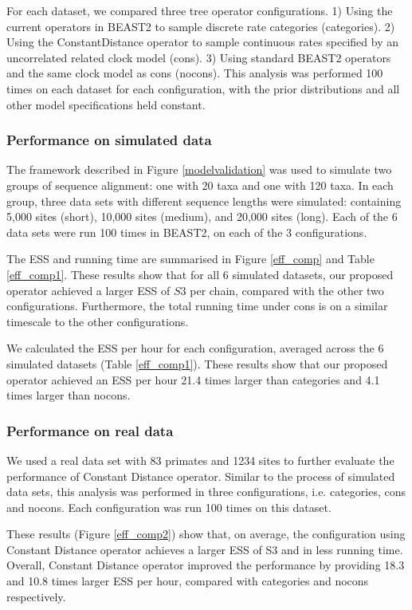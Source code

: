\documentclass{bmcart}
\begin{document}
For each dataset, we compared three tree operator configurations. 1) Using the current operators in BEAST2 to sample discrete rate categories (categories). 2) Using the ConstantDistance operator to sample continuous rates specified by an uncorrelated related clock model (cons). 3) Using standard BEAST2 operators and the same clock model as cons (nocons). This analysis was performed 100 times on each dataset for each configuration, with the prior distributions and all other model specifications held constant.

\subsubsection*{Performance on simulated data}
The framework described in Figure \ref{modelvalidation} was used to simulate two groups of sequence alignment: one with 20 taxa and one with 120 taxa. In each group, three data sets with different sequence lengths were simulated: containing 5,000 sites (short), 10,000 sites (medium), and 20,000 sites (long). Each of the 6 data sets were run 100 times in BEAST2, on each of the 3 configurations.

The ESS and running time are summarised in Figure \ref{eff_comp} and Table \ref{eff_comp1}. These results show that for all 6 simulated datasets, our proposed operator achieved a larger ESS of $S3$ per chain, compared with the other two configurations. Furthermore, the total running time under cons is on a similar timescale to the other configurations.

We calculated the ESS per hour for each configuration, averaged across the 6 simulated datasets (Table \ref{eff_comp1}). These results show that our proposed operator achieved an ESS per hour 21.4 times larger than categories and 4.1 times larger than nocons.

\subsubsection*{Performance on real data}
We used a real data set with 83 primates and 1234 sites \cite{finstermeier2013mitogenomic} to further evaluate the performance of Constant Distance operator. Similar to the process of simulated data sets, this analysis was performed in three configurations, i.e. categories, cons and nocons. Each configuration was run 100 times on this dataset.

These results (Figure \ref{eff_comp2}) show that, on average, the configuration using Constant Distance operator achieves a larger ESS of S3 and in less running time. Overall, Constant Distance operator improved the performance by providing 18.3 and 10.8 times larger ESS per hour, compared with categories and nocons respectively.
\end{document}
